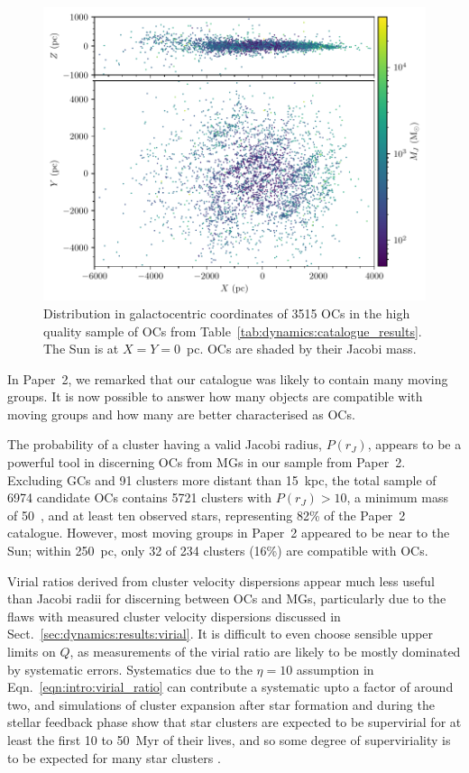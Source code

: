 \begin{figure}[t]
    \centering
    \includegraphics[width=\textwidth]{fig/c4/discussion_xyz_distribution.pdf}
    \caption[Distribution in galactocentric coordinates of 3515 OCs in the high quality sample of OCs]{Distribution in galactocentric coordinates of 3515 OCs in the high quality sample of OCs from Table~\ref{tab:dynamics:catalogue_results}. The Sun is at $X=Y=0$~pc. OCs are shaded by their Jacobi mass.}
    \label{fig:dynamics:discussion:xyz_distribution}
\end{figure}


In Paper~2, we remarked that our catalogue was likely to contain many moving groups. It is now possible to answer how many objects are compatible with moving groups and how many are better characterised as OCs.

The probability of a cluster having a valid Jacobi radius, $P(r_J)$, appears to be a powerful tool in discerning OCs from MGs in our sample from Paper~2. Excluding GCs and 91 clusters more distant than 15~kpc, the total sample of 6974 candidate OCs contains 5721 clusters with $P(r_J)>10$, a minimum mass of 50~\MSun, and at least ten observed stars, representing 82\% of the Paper~2 catalogue. However, most moving groups in Paper~2 appeared to be near to the Sun; within 250~pc, only 32 of 234 clusters (16\%) are compatible with OCs.

Virial ratios derived from cluster velocity dispersions appear much less useful than Jacobi radii for discerning between OCs and MGs, particularly due to the flaws with measured cluster velocity dispersions discussed in Sect.~\ref{sec:dynamics:results:virial}. It is difficult to even choose sensible upper limits on $Q$, as measurements of the virial ratio are likely to be mostly dominated by systematic errors. Systematics due to the $\eta=10$ assumption in Eqn.~\ref{eqn:intro:virial_ratio} can contribute a systematic upto a factor of around two, and simulations of cluster expansion after star formation and during the stellar feedback phase show that star clusters are expected to be supervirial for at least the first 10 to 50~Myr of their lives, and so some degree of superviriality is to be expected for many star clusters \citep{banerjee_how_2017}. 

